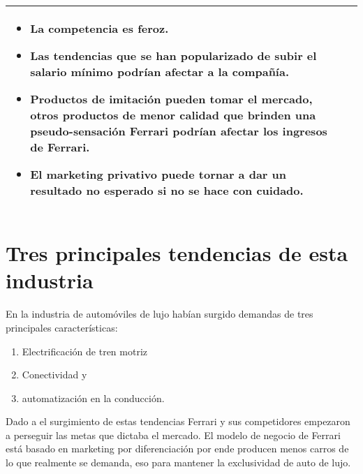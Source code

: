 \documentclass{article}
\begin{document}
\begin{center}
\begin{tabular}{ |p{8cm}|p{8cm}| }
\begin{itemize}
                \item La competencia es feroz.
                \item Las tendencias que se han popularizado de subir el salario mínimo podrían afectar a la compañía. 
                \item Productos de imitación pueden tomar el mercado, otros productos de menor calidad que brinden una pseudo-sensación Ferrari podrían afectar los ingresos de Ferrari.
                \item El marketing privativo puede tornar a dar un resultado no esperado si no se hace con cuidado.
            \end{itemize} \\ 
        \hline
    \end{tabular}
\end{center}







\section{Tres principales tendencias de esta industria}
En la industria de automóviles de lujo habían surgido demandas de tres principales características: 
\begin{enumerate}
    \item Electrificación de tren motriz 
    \item Conectividad y  
    \item automatización en la conducción.
\end{enumerate}
Dado a el surgimiento de estas tendencias Ferrari y sus competidores empezaron a perseguir las metas que dictaba el mercado. El modelo de negocio de Ferrari está basado en marketing por diferenciación por ende producen menos carros de lo que realmente se demanda, eso para mantener la exclusividad de auto de lujo. 

\end{document}
